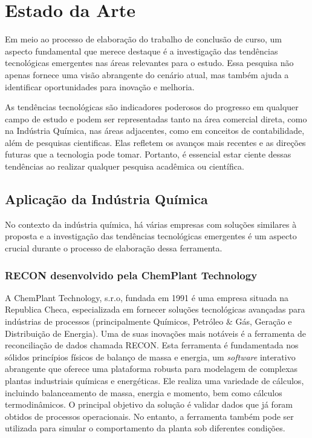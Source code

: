 \section{Estado da Arte}

Em meio ao processo de elaboração do trabalho de conclusão de curso, um aspecto fundamental que merece destaque é a investigação das tendências tecnológicas emergentes nas áreas relevantes para o estudo. Essa pesquisa não apenas fornece uma visão abrangente do cenário atual, mas também ajuda a identificar oportunidades para inovação e melhoria.

As tendências tecnológicas são indicadores poderosos do progresso em qualquer campo de estudo e podem ser representadas tanto na área comercial direta, como na Indústria Química, nas áreas adjacentes, como em conceitos de contabilidade, além de pesquisas cientificas. Elas refletem os avanços mais recentes e as direções futuras que a tecnologia pode tomar. Portanto, é essencial estar ciente dessas tendências ao realizar qualquer pesquisa acadêmica ou científica.

\subsection{Aplicação da Indústria Química}

No contexto da indústria química, há várias empresas com soluções similares à proposta e a investigação das tendências tecnológicas emergentes é um aspecto crucial durante o processo de elaboração dessa ferramenta. 

\subsubsection{RECON desenvolvido pela ChemPlant Technology}

A ChemPlant Technology, s.r.o, fundada em 1991 é uma empresa situada na Republica Checa, especializada em fornecer soluções tecnológicas avançadas para indústrias de processos (principalmente Químicos, Petróleo $\&$ Gás, Geração e Distribuição de Energia). Uma de suas inovações mais notáveis é a ferramenta de reconciliação de dados chamada RECON. Esta ferramenta é fundamentada nos sólidos princípios físicos de balanço de massa e energia, um \textit{software} interativo abrangente que oferece uma plataforma robusta para modelagem de complexas plantas industriais químicas e energéticas. Ele realiza uma variedade de cálculos, incluindo balanceamento de massa, energia e momento, bem como cálculos termodinâmicos. O principal objetivo da solução é validar dados que já foram obtidos de processos operacionais. No entanto, a ferramenta também pode ser utilizada para simular o comportamento da planta sob diferentes condições.

